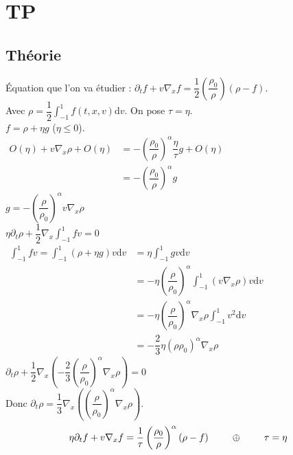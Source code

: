 \documentclass[12pt,a4paper]{article}
\begin{document}
\section{TP}
\subsection{Théorie}

Équation que l'on va étudier : $\partial_t f + v\nabla_x f = \dfrac12\left(\dfrac{\rho_0}\rho\right)(\rho-f)$.\\
Avec $\rho = \dfrac12\displaystyle\int_{-1}^1 f(t,x,v)\mathrm dv$. On pose $\tau = \eta$.\\
$f = \rho + \eta g$ ($\eta \leq 0$).\\
$\begin{aligned}
	O(\eta) + v\nabla_x\rho + O(\eta) &= -\left(\dfrac{\rho_0}\rho\right)^\alpha \dfrac\eta{\tau}g + O(\eta)\\
	&= - \left(\dfrac{\rho_0}\rho\right)^\alpha g
\end{aligned}$\\
$g = -\left(\dfrac\rho{\rho_0}\right)^\alpha v\nabla_x\rho$\\

$\eta\partial_t \rho + \dfrac12 \nabla_x\displaystyle\int_{-1}^1 fv = 0$\\
$\begin{aligned}
	\displaystyle\int_{-1}^1 fv = \int_{-1}^1 (\rho + \eta g) v \mathrm dv& = \eta \int_{-1}^1 gv \mathrm dv\\
	&=-\eta\left(\dfrac\rho{\rho_0}\right)^\alpha \displaystyle\int_{-1}^1 \left(v\nabla_x\rho\right) v \mathrm dv \\
	&= -\eta\left(\dfrac\rho{\rho_0}\right)^\alpha\nabla_x \rho\int_{-1}^1 v^2\mathrm dv \\
	&= -\dfrac23 \eta\left(\rho{\rho_0}\right)^\alpha\nabla_x\rho
\end{aligned}$\\

\noindent$\partial_t\rho + \dfrac12\nabla_x \left(-\dfrac23\left(\dfrac\rho{\rho_0}\right)^\alpha\nabla_x\rho\right) = 0$\\
Donc $\partial_t \rho = \dfrac13 \nabla_x\left(\left(\dfrac\rho{\rho_0}\right)^\alpha\nabla_x\rho\right)$.\\

\[
\eta\partial_t f + v\nabla_x f = \dfrac1\tau\left(\dfrac{\rho_0}\rho\right)^\alpha (\rho - f)\hspace{.8cm}\oplus\hspace{.8cm}\tau = \eta
\]
\end{document}
